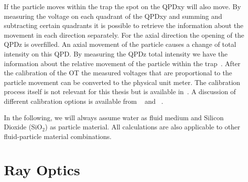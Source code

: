 If the particle moves within the trap the spot on the QPDxy will also move. By 
measuring the voltage on each quadrant of the QPDxy and summing and subtracting 
certain quadrants it is possible to retrieve the information about the movement 
in each direction separately. For the axial direction the opening of the QPDz 
is overfilled. An axial movement of the particle causes a change of total 
intensity on this QPD. By measuring the QPDz total intensity we have the 
information about the relative movement of the particle within the 
trap~\cite{Felgner1995a}. After the calibration of the OT the measured 
voltages that are proportional to the particle movement can be converted to the 
physical unit meter. The calibration process itself is not relevant for this 
thesis but is available in~\cite{Lamprecht2017}. A discussion of different 
calibration options is available from 
\citeauthor{Svoboda1994}~\cite{Svoboda1994} and 
\citeauthor{Jun2004}~\cite{Jun2004}.

In the following, we will always assume water as fluid medium and Silicon 
Dioxide (SiO$_{2}$) as particle material. All calculations are also applicable 
to other fluid-particle material combinations.

\section{Ray Optics\label{sec:TO-rayoptics}}


